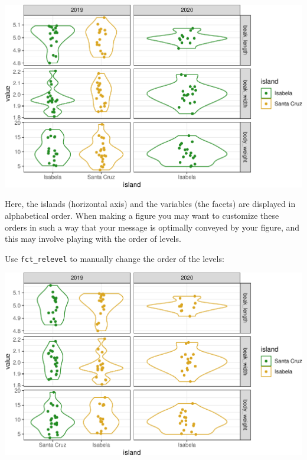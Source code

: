 \documentclass[]{book}
\newenvironment{Shaded}{}{}
\newcommand{\CommentTok}[1]{\textcolor[rgb]{0.38,0.63,0.69}{\textit{#1}}}
\newcommand{\KeywordTok}[1]{\textcolor[rgb]{0.00,0.44,0.13}{\textbf{#1}}}
\newcommand{\NormalTok}[1]{#1}
\newcommand{\OperatorTok}[1]{\textcolor[rgb]{0.40,0.40,0.40}{#1}}
\newcommand{\StringTok}[1]{\textcolor[rgb]{0.25,0.44,0.63}{#1}}
\begin{document}
\begin{center}\includegraphics[width=\textwidth]{TRES-Tidy-Tutorial_files/figure-latex/unnamed-chunk-61-1} \end{center}

Here, the islands (horizontal axis) and the variables (the facets) are displayed in alphabetical order. When making a figure you may want to customize these orders in such a way that your message is optimally conveyed by your figure, and this may involve playing with the order of levels.

Use \texttt{fct\_relevel} to manually change the order of the levels:

\begin{Shaded}
\end{Shaded}

\begin{center}\includegraphics[width=\textwidth]{TRES-Tidy-Tutorial_files/figure-latex/unnamed-chunk-62-1} \end{center}
\end{document}
